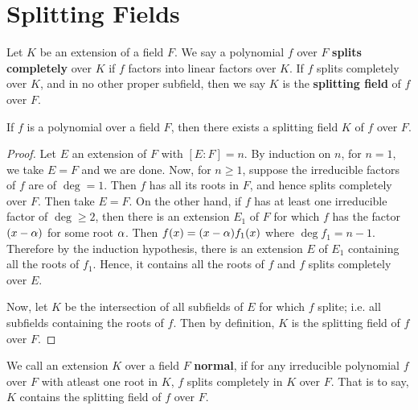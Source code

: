\section{Splitting Fields}
\label{section_8.4}

\begin{definition}
  Let $K$ be an extension of a field  $F$. We say a polynomial  $f$ over  $F$
  \textbf{splits completely} over $K$ if  $f$ factors into linear factors
  over  $K$. If  $f$ splits completely over  $K$, and in no other proper
  subfield, then we say  $K$ is the  \textbf{splitting field} of $f$ over
  $F$.
\end{definition}

\begin{theorem}\label{theorem_8.4.1}
  If $f$ is a polynomial over a field  $F$, then there exists a splitting
  field  $K$ of  $f$ over  $F$.
\end{theorem}
\begin{proof}
  Let $E$ an extension of  $F$ with  $[E:F]=n$. By induction on $n$, for
  $n=1$, we take  $E=F$ and we are done. Now, for  $n \geq 1$, suppose the
  irreducible factors of  $f$ are of $\deg=1$. Then $f$ has all its roots in
  $F$, and hence splits completely over $F$. Then take $E=F$. On the other
  hand, if  $f$ has at least one irreducible factor of $\deg \geq 2$, then
  there is an extension $E_1$ of $F$ for which $f$ has the factor $(x-\alpha)$ for
  some root $\alpha$. Then $f(x)=(x-\alpha)f_1(x)$ where $\deg{f_1}=n-1$. Therefore by
  the induction hypothesis, there is an extension $E$ of  $E_1$ containing all
  the roots of $f_1$. Hence, it contains all the roots of $f$ and  $f$ splits
  completely over  $E$.

  Now, let $K$ be the intersection of all subfields of $E$ for which $f$
  splite; i.e. all subfields containing the roots of $f$. Then by definition,
  $K$ is the splitting field of  $f$ over  $F$.
\end{proof}

\begin{definition}
  We call an extension $K$ over a field  $F$  \textbf{normal}, if for any
  irreducible polynomial $f$ over $F$ with atleast one root in $K$, $f$ splits
  completely in  $K$ over $F$. That is to say, $K$ contains the splitting
  field of  $f$ over  $F$.
\end{definition}

